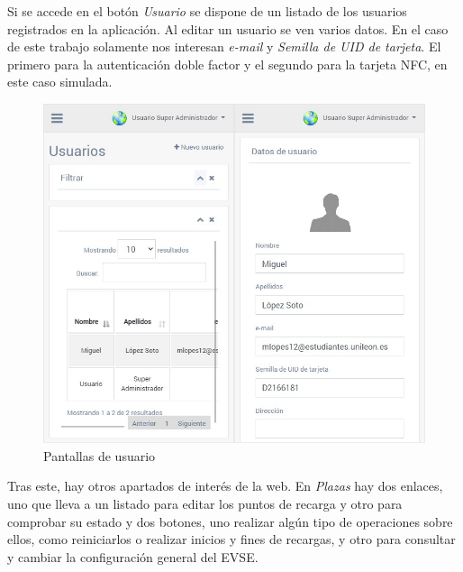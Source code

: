 \documentclass[12pt,a4paper,onecolumn,oneside]{report}
\begin{document}
Si se accede en el botón \textit{Usuario} se dispone de un listado de los usuarios registrados en la aplicación. Al editar un usuario se ven varios datos. En el caso de este trabajo solamente nos interesan \textit{e-mail} y \textit{Semilla de UID de tarjeta}. El primero para la autenticación doble factor y el segundo para la tarjeta NFC, en este caso simulada.

\begin{figure}[H] 
\centering
  \includegraphics[width=1\textwidth]{figuras/design3.png}
  \caption[Pantallas de usuario]{Pantallas de usuario\\
  }
  \label{fig:design3}
\end{figure}

Tras este, hay otros apartados de interés de la web. En \textit{Plazas} hay dos enlaces, uno que lleva a un listado para editar los puntos de recarga y otro para comprobar su estado y dos botones, uno realizar algún tipo de operaciones sobre ellos, como reiniciarlos o realizar inicios y fines de recargas, y otro para consultar y cambiar la configuración general del EVSE.
\end{document}
